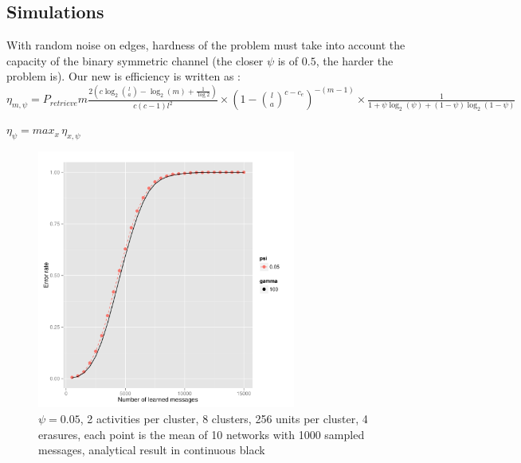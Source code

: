 \documentclass[english,10pt,twocolumn]{IEEEtran}
\theoremstyle{definition}
\begin{document}
	\subsection{Simulations}
	
	With random noise on edges, hardness of the problem must take into account the capacity of the binary symmetric channel (the closer $\psi$ is of $0.5$, the harder the problem is). Our new is efficiency is written as :  	
	$\eta_{m, \psi} = P_{retrieve} m  \frac{2 \left(c \log_2{l \choose a } - \log_2(m) + \frac{1}{\log 2} \right)}{c(c-1)l^2} \times (1-{l \choose a}^{c - c_e})^{-(m-1)} \times \frac{1}{1 + \psi \log_2(\psi) +(1-\psi) \log_2(1-\psi)} $
	
	$\eta_\psi = max_x \, \eta_{x, \psi}$
	\begin{figure}[!htb]
		\includegraphics[width=8.5cm]{Courbes/thpsi_c8l256e4}
		\caption{$\psi = 0.05$, 2 activities per cluster, 8 clusters, 256 units per cluster, 4 erasures, each point is the mean of 10 networks with 1000 sampled messages, analytical result in continuous black}
		\label{psith}
	\end{figure}
	
\end{document}
